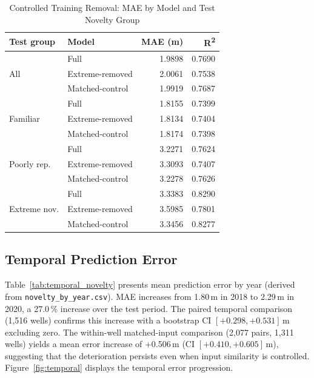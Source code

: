 \documentclass[conference]{IEEEtran}
\begin{document}
\begin{table}[htbp]
\centering
\caption{Controlled Training Removal: MAE by Model and Test Novelty Group}
\label{tab:removal}
\begin{tabular}{@{}llrr@{}}
\toprule
\textbf{Test group} & \textbf{Model} & \textbf{MAE (m)} & \textbf{R\textsuperscript{2}} \\
\midrule
\multirow{3}{*}{All} & Full           & 1.9898 & 0.7690 \\
                     & Extreme-removed & 2.0061 & 0.7538 \\
                     & Matched-control & 1.9919 & 0.7687 \\
\midrule
\multirow{3}{*}{Familiar} & Full           & 1.8155 & 0.7399 \\
                          & Extreme-removed & 1.8134 & 0.7404 \\
                          & Matched-control & 1.8174 & 0.7398 \\
\midrule
\multirow{3}{*}{Poorly rep.} & Full           & 3.2271 & 0.7624 \\
                             & Extreme-removed & 3.3093 & 0.7407 \\
                             & Matched-control & 3.2278 & 0.7626 \\
\midrule
\multirow{3}{*}{Extreme nov.} & Full           & 3.3383 & 0.8290 \\
                              & Extreme-removed & 3.5985 & 0.7801 \\
                              & Matched-control & 3.3456 & 0.8277 \\
\bottomrule
\end{tabular}
\end{table}

\subsection{Temporal Prediction Error}

Table~\ref{tab:temporal_novelty} presents mean prediction error by year
(derived from \texttt{novelty\_by\_year.csv}).
MAE increases from 1.80\,m in 2018 to 2.29\,m in 2020, a 27.0\,\%
increase over the test period.
The paired temporal comparison (1{,}516 wells) confirms this increase with
a bootstrap CI $[+0.298, +0.531]$\,m excluding zero.
The within-well matched-input comparison (2{,}077 pairs, 1{,}311 wells)
yields a mean error increase of +0.506\,m (CI $[+0.410, +0.605]$\,m),
suggesting that the deterioration persists even when input similarity is
controlled.
Figure~\ref{fig:temporal} displays the temporal error progression.
\end{document}
